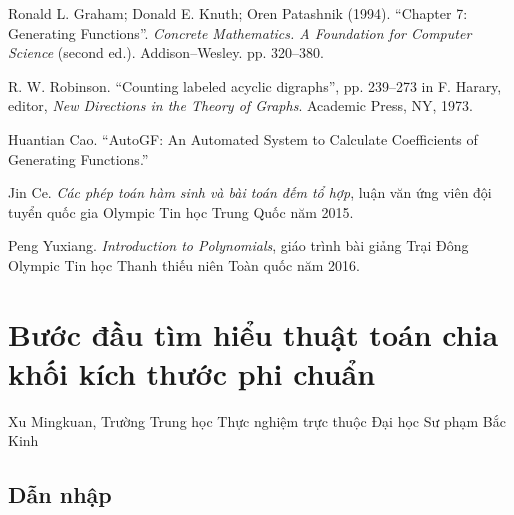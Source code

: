 \documentclass[11pt]{article}
\begin{document}
\begin{enumerate}[label={[\arabic*]}]
  \item Ronald L. Graham; Donald E. Knuth; Oren Patashnik (1994). ``Chapter 7:
  Generating Functions''. \emph{Concrete Mathematics. A Foundation for Computer
  Science} (second ed.). Addison--Wesley. pp. 320--380.

  \item R. W. Robinson. ``Counting labeled acyclic digraphs'', pp. 239--273
  in F. Harary, editor, \emph{New Directions in the Theory of Graphs}.
  Academic Press, NY, 1973.

  \item Huantian Cao. ``AutoGF: An Automated System to Calculate Coefficients
  of Generating Functions.''

  \item Jin Ce. \emph{Các phép toán hàm sinh và bài toán đếm tổ hợp}, luận văn
  ứng viên đội tuyển quốc gia Olympic Tin học Trung Quốc năm 2015.

  \item Peng Yuxiang. \emph{Introduction to Polynomials}, giáo trình bài giảng
  Trại Đông Olympic Tin học Thanh thiếu niên Toàn quốc năm 2016.
\end{enumerate}

\section{Bước đầu tìm hiểu thuật toán chia khối kích thước phi chuẩn}

\begin{center}
Xu Mingkuan, Trường Trung học Thực nghiệm trực thuộc Đại học Sư phạm Bắc Kinh
\end{center}

\renewcommand{\abstractname}{Tóm tắt}
\begin{abstract}
Chia khối là một thuật toán thực dụng, đơn giản và dễ cài đặt. Nó không chỉ có
thể giải nhiều bài toán thao tác trên cấu trúc dữ liệu tuyến tính, mà còn có
thể tối ưu một số thuật toán khác. Bài viết này giới thiệu cách xác định kích
thước khối tối ưu, dùng một số ví dụ để giới thiệu ứng dụng trực tiếp của chia
khối kích thước phi chuẩn, đồng thời giới thiệu vài ứng dụng dùng chia khối
kích thước phi chuẩn để tối ưu thuật toán khác.
\end{abstract}

\subsection{Dẫn nhập}
\end{document}
